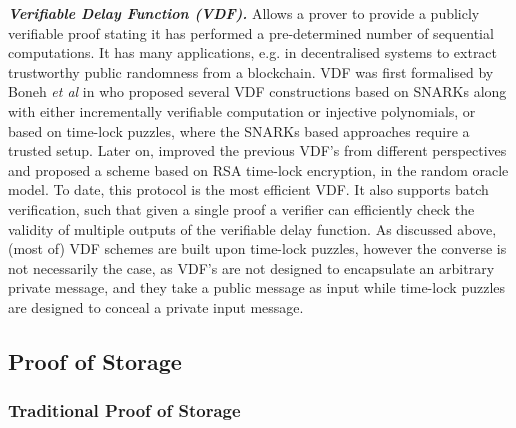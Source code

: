 \noindent\textbf{\textit{Verifiable Delay Function (VDF).}} Allows a prover to provide a publicly verifiable proof stating  it has performed  a pre-determined number of sequential computations. It has many applications, e.g. in decentralised systems to extract  trustworthy public randomness from a blockchain. VDF was first formalised by Boneh \textit{et al} in \cite{BonehBBF18} who proposed several VDF constructions based on SNARKs along with either  incrementally verifiable computation or injective polynomials, or based on time-lock puzzles, where  the SNARKs based approaches require a trusted setup.  Later on,  \cite{Wesolowski19} improved the previous VDF's  from different perspectives and proposed a scheme  based on RSA time-lock encryption, in the random oracle model. To date, this protocol is the most efficient VDF.  It also supports batch verification, such that given a single proof a verifier can efficiently check the validity of multiple outputs of the verifiable delay function. As discussed above, (most of) VDF schemes are built  upon time-lock puzzles, however the converse is not necessarily the case, as VDF's are not designed to encapsulate an  arbitrary private message, and they take a public message as input while time-lock puzzles are designed to conceal a private input message. 



\subsection{Proof of Storage}\label{related-work-PoR}

\subsubsection{Traditional Proof of Storage}

